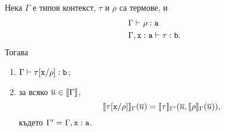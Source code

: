 \begin{framed}
\begin{lemma}\label{lem:pcf:substitution}
  Нека $\Gamma$ е типов контекст, $\tau$ и $\rho$ са термове, и
  \begin{align*}
    & \Gamma \vdash \rho : \texttt{a}\\
    & \Gamma, \texttt{x}:\texttt{a} \vdash \tau : \texttt{b}.
  \end{align*}
  Тогава
  \begin{enumerate}[1)]
  \item
    $\Gamma \vdash \tau[\texttt{x}/{\rho}] : \texttt{b}$;
  \item
    за всяко $\overline{u} \in \llbracket{\Gamma}\rrbracket$,
    \[\llbracket{\tau[\texttt{x}/{\rho}]}\rrbracket_\Gamma(\overline{u}) = \llbracket{\tau}\rrbracket_{\Gamma'}(\overline{u},\llbracket{\rho}\rrbracket_\Gamma(\overline{u})),\]
    където $\Gamma' = \Gamma, \texttt{x}:\texttt{a}$.  
  \end{enumerate}
\end{lemma}
\end{framed}
